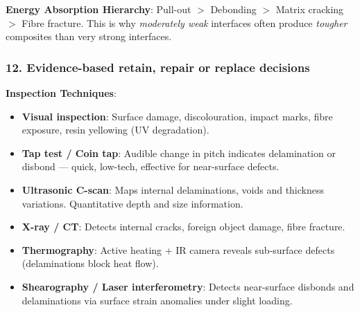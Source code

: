 \documentclass{NoteThesis/note-thesis}
\begin{document}
\textbf{Energy Absorption Hierarchy}: Pull-out $>$ Debonding $>$ Matrix cracking $>$ Fibre fracture. This is why \textit{moderately weak} interfaces often produce \textit{tougher} composites than very strong interfaces.

\subsubsection*{12. Evidence-based retain, repair or replace decisions}

\textbf{Inspection Techniques}:
\begin{itemize}
    \item \textbf{Visual inspection}: Surface damage, discolouration, impact marks, fibre exposure, resin yellowing (UV degradation).
    \item \textbf{Tap test / Coin tap}: Audible change in pitch indicates delamination or disbond — quick, low-tech, effective for near-surface defects.
    \item \textbf{Ultrasonic C-scan}: Maps internal delaminations, voids and thickness variations. Quantitative depth and size information.
    \item \textbf{X-ray / CT}: Detects internal cracks, foreign object damage, fibre fracture.
    \item \textbf{Thermography}: Active heating + IR camera reveals sub-surface defects (delaminations block heat flow).
    \item \textbf{Shearography / Laser interferometry}: Detects near-surface disbonds and delaminations via surface strain anomalies under slight loading.
\end{itemize}
\end{document}
